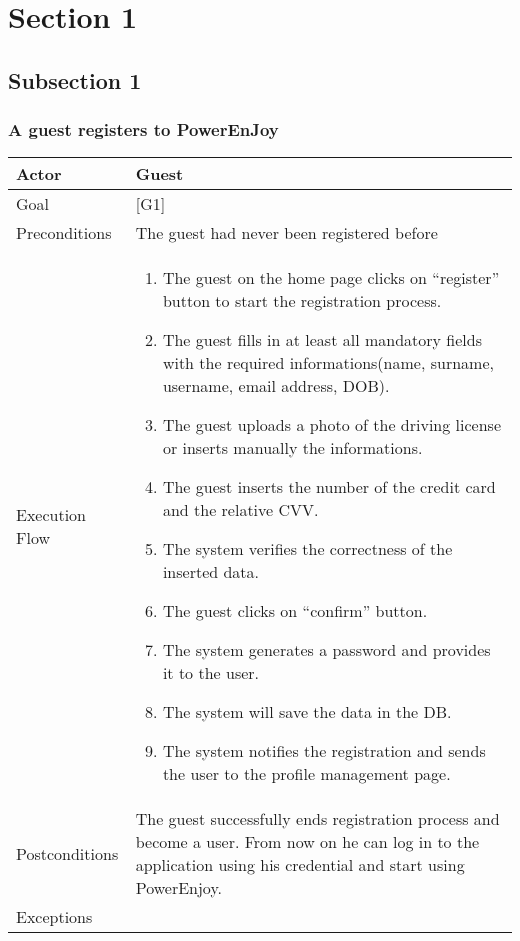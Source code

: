 \documentclass{article}
\begin{document}
	\section{Section 1}
	\subsection{Subsection 1}

	\subsubsection{A guest registers to PowerEnJoy}
	\begin{tabularx}{\textwidth}{  l  X  }
		\hline
		Actor & Guest\\
		\hline
		Goal & [G1]\\
		\hline
		Preconditions & The guest had never been registered before\\
		\hline
		Execution Flow & \begin{enumerate}
                     \item{The guest on the home page clicks on “register” button to start the registration process.}
						 				 \item{The guest fills in at least all mandatory fields with the required informations(name, surname, username, email address, DOB).}
						 			 	 \item{The guest uploads a photo of the driving license or inserts manually the informations.}
										 \item{The guest inserts the number of the credit card and the relative CVV}.
						  		 	 \item{The system verifies the correctness of the inserted data.}
						 			 	 \item{The guest clicks on “confirm” button.}
						 			 	 \item{The system generates a password and provides it to the user.}
						 			 	 \item{The system will save the data in the DB.}
						 			 	 \item{The system notifies the registration and sends the user to the profile management page.}
						 \end{enumerate}\\
		\hline
		Postconditions & The guest successfully ends registration process and become a user. From now on he can log in to the application using his credential and start using PowerEnjoy.\\
		\hline
		Exceptions & \begin{enumerate}

\end{enumerate}
\end{tabularx}
\end{document}

